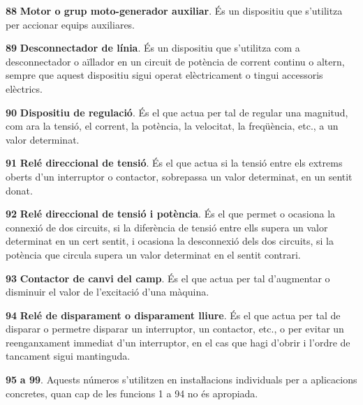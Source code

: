 \begin{multicols}{2}
\begin{list}{}
\item[\textbf{88}]  
 \textbf{Motor o grup moto-generador auxiliar}. És un dispositiu que s'utilitza per
accionar equips auxiliares.

\item[\textbf{89}]  
 \textbf{Desconnectador de línia}. És
un dispositiu que s'utilitza com a desconnectador o aïllador en un
circuit de potència de corrent continu o altern, sempre que aquest
dispositiu sigui operat elèctricament o tingui accessoris elèctrics.

\item[\textbf{90}]   
\textbf{Dispositiu de regulació}. És el que
actua per tal de regular una magnitud, com ara la tensió, el corrent, la potència,
la velocitat, la freqüència, etc., a un valor determinat.

\item[\textbf{91}]   
\textbf{Relé direccional de tensió}.
És el que actua si la tensió entre els extrems oberts d'un
interruptor o contactor, sobrepassa un valor determinat, en un
sentit donat.

\item[\textbf{92}]   
\textbf{Relé direccional de tensió i potència}. És el que permet o ocasiona la connexió de
dos circuits, si la diferència de tensió entre ells supera un
valor determinat en un cert sentit, i ocasiona la desconnexió dels
dos circuits, si la potència que circula supera un valor determinat
en el sentit contrari.

\item[\textbf{93}]   
\textbf{Contactor de canvi del camp}. És el
que actua per tal d'augmentar o disminuir el valor de l'excitació
d'una màquina.

\item[\textbf{94}]   
\textbf{Relé de disparament o disparament lliure}. És el que actua per tal de disparar o permetre disparar un
interruptor, un contactor, etc., o per evitar un reenganxament
immediat d'un interruptor, en el cas que hagi d'obrir i l'ordre de
tancament sigui mantinguda.

\item[\textbf{95}] \textbf{a 99}. Aquests números s'utilitzen en instaŀlacions
individuals per a aplicacions concretes, quan cap de les funcions 1
a 94 no és apropiada.

\end{list}
\end{multicols}


